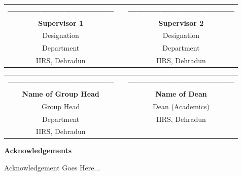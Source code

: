 \documentclass[
12pt, %
english,
onehalfspacing, %
headsepline, %
]{MastersDoctoralThesis} %
\begin{document}
\vspace*{0.2\textheight}

\begin{table}[h]

\centering
\begin{tabular}{c c c}

\textbf{---------------------------------------} &    &
\textbf{---------------------------------------} \\

\textbf{Supervisor 1} &    & \textbf{Supervisor 2} \\ 
Designation &  & Designation \\
Department &  & Department \\
IIRS, Dehradun &  & IIRS, Dehradun \\

\end{tabular}
\end{table}

\vspace*{0.1\textheight}

\begin{table}[h]

\centering
\begin{tabular}{c c c}

\textbf{---------------------------------------} &    &
\textbf{---------------------------------------} \\

\textbf{Name of Group Head} &    & \textbf{Name of Dean} \\ 
Group Head &  & Dean (Academics) \\
Department &  & IIRS, Dehradun \\
IIRS, Dehradun &  &  \\

\end{tabular}
\end{table}






\cleardoublepage



\begin{center}
    \LARGE{\textbf{Acknowledgements}}
\end{center}
Acknowledgement Goes Here...
\end{document}
